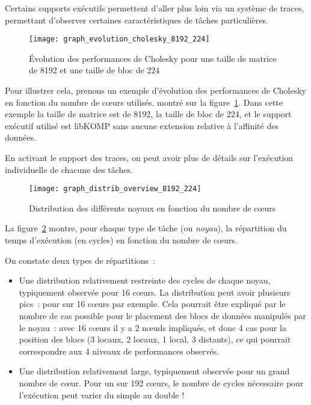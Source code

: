 Certains supports exécutifs permettent d'aller plus loin via un système de traces, permettant d'observer certaines caractéristiques de tâches particulières.

\begin{figure}[t!]
  \centering
  \texttt{[image: graph\_evolution\_cholesky\_8192\_224]}
  \caption{Évolution des performances de Cholesky pour une taille de matrice de 8192 et une taille de bloc de 224}\label{fig:contribs:apps:cholesky:overview-8192-224}
\end{figure}

Pour illustrer cela, prenons un exemple d'évolution des performances de Cholesky en fonction du nombre de cœurs utilisés, montré sur la figure~\ref{fig:contribs:apps:cholesky:overview-8192-224}. Dans cette exemple la taille de matrice est de 8192, la taille de bloc de 224, et le support exécutif utilisé est libKOMP sans aucune extension relative à l'affinité des données.

En activant le support des traces, on peut avoir plus de détails sur l'exécution individuelle de chacune des tâches.

\begin{figure}[h!]
  \centering
  \texttt{[image: graph\_distrib\_overview\_8192\_224]}
  \caption{Distribution des différents noyaux en fonction du nombre de cœurs}\label{fig:contribs:apps:cholesky:distrib-overview-8192-224}
\end{figure}

La figure~\ref{fig:contribs:apps:cholesky:distrib-overview-8192-224} montre, pour chaque type de tâche (ou \emph{noyau}), la répartition du temps d'exécution (en cycles) en fonction du nombre de cœurs.

On constate deux types de répartitions~:
\begin{itemize}
  \item Une distribution relativement restreinte des cycles de chaque noyau, typiquement observée pour 16 cœurs.
    La distribution peut avoir plusieurs pics~: pour \gemm sur 16 cœurs par exemple.
    Cela pourrait être expliqué par le nombre de cas possible pour le placement des blocs de données manipulés par le noyau~: avec 16 cœurs il y a 2 nœuds impliqués, et donc 4 cas pour la position des blocs (3 locaux, 2 locaux, 1 local, 3 distants), ce qui pourrait correspondre aux 4 niveaux de performances observés.
  \item Une distribution relativement large, typiquement observée pour un grand nombre de cœur. Pour un \gemm sur 192 cœurs, le nombre de cycles nécessaire pour l'exécution peut varier du simple au double !
\end{itemize}

